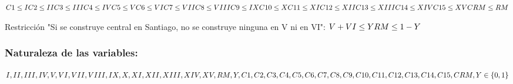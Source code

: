 \documentclass[12pt,letterpaper]{article}
\begin{document}
$\\
C1 \leq I \\
C2 \leq II \\
C3 \leq III \\
C4 \leq IV \\
C5 \leq V \\
C6 \leq VI \\
C7 \leq VII \\
C8 \leq VIII \\
C9 \leq IX \\
C10 \leq X \\
C11 \leq XI \\
C12 \leq XII \\
C13 \leq XIII \\
C14 \leq XIV \\
C15 \leq XV \\
CRM \leq RM
$

Restricción "Si se construye central en Santiago, no se construye ninguna en V ni en VI":
$\\
V + VI \leq Y \\
RM \leq 1 - Y
$

\subsubsection{Naturaleza de las variables:}
$I, II, III, IV, V, VI, VII, VIII, IX, X, XI, XII, XIII, XIV, XV, RM, Y,\\ C1, C2, C3, C4, C5, C6, C7, C8, C9, C10, C11, C12, C13, C14, C15, CRM, Y \in \{0,1\}$
\end{document}
